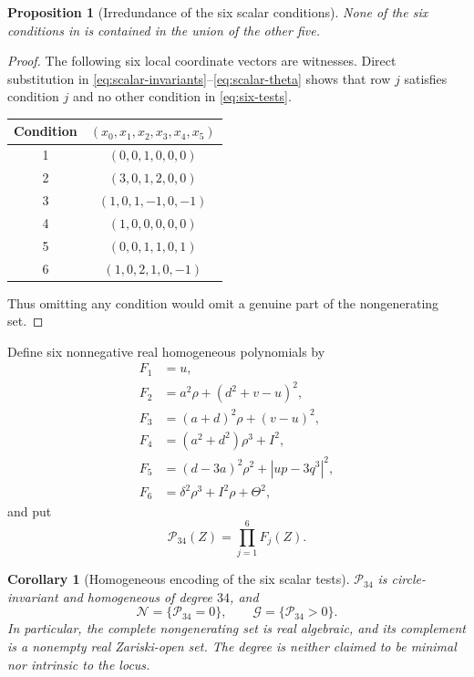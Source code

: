 \documentclass[11pt,a4paper]{article}
\newtheorem{proposition}[proposition]{Proposition}
\newtheorem{corollary}[corollary]{Corollary}
\begin{document}
\begin{proposition}[Irredundance of the six scalar conditions]\label{prop:irredundant-tests}
None of the six conditions in  is contained in the union of the other five.
\end{proposition}
\begin{proof}
The following six local coordinate vectors are witnesses.  Direct substitution in \eqref{eq:scalar-invariants}--\eqref{eq:scalar-theta} shows that row $j$ satisfies condition $j$ and no other condition in \eqref{eq:six-tests}.

\begin{center}
\begin{tabular}{cc}\toprule
Condition & $(x_0,x_1,x_2,x_3,x_4,x_5)$\\\midrule
1 & $(0,0,1,0,0,0)$ \\
2 & $(3,0,1,2,0,0)$ \\
3 & $(1,0,1,-1,0,-1)$ \\
4 & $(1,0,0,0,0,0)$ \\
5 & $(0,0,1,1,0,1)$ \\
6 & $(1,0,2,1,0,-1)$ \\
\bottomrule\end{tabular}
\end{center}
Thus omitting any condition would omit a genuine part of the nongenerating set.
\end{proof}

Define six nonnegative real homogeneous polynomials by
\begin{align}
F_1&=u,\nonumber\\
F_2&=a^2\rho+(d^2+v-u)^2,\nonumber\\
F_3&=(a+d)^2\rho+(v-u)^2,\nonumber\\
F_4&=(a^2+d^2)\rho^3+I^2,\label{eq:classifier-factors}\\
F_5&=(d-3a)^2\rho^2+|up-3q^3|^2,\nonumber\\
F_6&=\delta^2\rho^3+I^2\rho+\Theta^2,\nonumber
\end{align}
and put
\begin{equation}
\mathcal P_{34}(Z)=\prod_{j=1}^{6}F_j(Z).
\label{eq:exact-polynomial}
\end{equation}


\begin{corollary}[Homogeneous encoding of the six scalar tests]
\label{thm:polynomial-classifier}
$\mathcal P_{34}$ is circle-invariant and homogeneous of degree $34$, and
\[
\mathcal N=\{\mathcal P_{34}=0\},\qquad
\mathcal G=\{\mathcal P_{34}>0\}.
\]
In particular, the complete nongenerating set is real algebraic, and its complement is a nonempty real Zariski-open set.  The degree is neither claimed to be minimal nor intrinsic to the locus.
\end{corollary}
\end{document}
